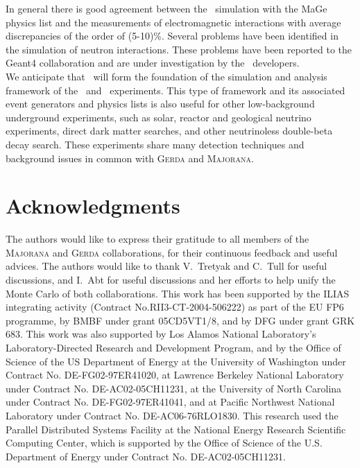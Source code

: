 \documentclass[article]{IEEEtran}
\begin{document}
In general there is good agreement between the \GF\ simulation with the MaGe physics list
and the measurements of electromagnetic interactions with average
discrepancies of the order of (5-10)\%. Several problems have been
identified in the simulation of neutron interactions.
These problems have been reported to the {\sc Geant4} collaboration
and are under investigation by the \MaGe\ developers.
\\

We anticipate that \MaGe\ will form the foundation of the
simulation and analysis framework of the \Gerda\ and \MJ\
experiments. This type of framework and its associated event generators and physics lists is also useful for other
low-background underground experiments, such as solar, 
reactor and geological neutrino experiments, direct dark matter searches, 
and other neutrinoless double-beta decay search.
These experiments share many detection techniques and background
issues in common with \textsc{Gerda} and \textsc{Majorana}.


\section*{Acknowledgments}

The authors would like to express their gratitude to all members of the 
\textsc{Majorana} and \textsc{Gerda} collaborations, for their continuous 
feedback and useful advices.
The authors would like to thank V.~Tretyak and C.~Tull for useful
discussions, and I.~Abt for useful
discussions and her efforts to help unify the Monte Carlo of both
collaborations. This work has been supported by the
\textsc{ILIAS} integrating activity (Contract No.RII3-CT-2004-506222)
as part of the EU FP6 programme, by BMBF under grant 05CD5VT1/8, 
and by DFG under grant GRK 683.
This work was also supported by
Los Alamos National Laboratory's Laboratory-Directed Research and Development Program,
and by the Office of Science of the US Department of Energy 
at the University of Washington under Contract No. DE-FG02-97ER41020, 
at Lawrence Berkeley National Laboratory under Contract No. DE-AC02-05CH11231, at the University of North Carolina under Contract No. DE-FG02-97ER41041, 
and at Pacific Northwest National Laboratory under Contract No. DE-AC06-76RLO1830. 
This research used the Parallel Distributed Systems Facility at the 
National Energy Research Scientific Computing Center, which is 
supported by the Office of Science of the U.S. Department of Energy 
under Contract No. DE-AC02-05CH11231.
\end{document}
